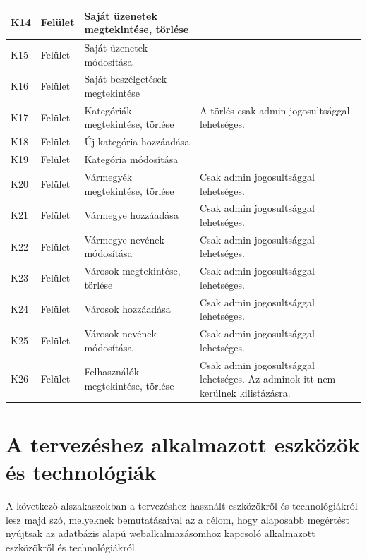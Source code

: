 \documentclass[]{thesis-ekf}
\theoremstyle{definition}
\theoremstyle{remark}
\begin{document}
\begin{longtable}{|l|l|p{3cm}|p{8cm}|}
			K14 & Felület & Saját üzenetek megtekintése, törlése & ~ \\ \hline
			K15 & Felület & Saját üzenetek módosítása & ~ \\ \hline
			K16 & Felület & Saját beszélgetések megtekintése & ~ \\ \hline
			K17 & Felület & Kategóriák megtekintése, törlése & A törlés csak admin jogosultsággal lehetséges. \\ \hline
			K18 & Felület & Új kategória hozzáadása & ~ \\ \hline
			K19 & Felület & Kategória módosítása & ~ \\ \hline
			K20 & Felület & Vármegyék megtekintése, törlése & Csak admin jogosultsággal lehetséges. \\ \hline
			K21 & Felület & Vármegye hozzáadása & Csak admin jogosultsággal lehetséges. \\ \hline
			K22 & Felület & Vármegye nevének módosítása & Csak admin jogosultsággal lehetséges. \\ \hline
			K23 & Felület & Városok megtekintése, törlése & Csak admin jogosultsággal lehetséges. \\ \hline
			K24 & Felület & Városok hozzáadása & Csak admin jogosultsággal lehetséges. \\ \hline
			K25 & Felület & Városok nevének módosítása & Csak admin jogosultsággal lehetséges. \\ \hline
			K26 & Felület & Felhasználók megtekintése, törlése & Csak admin jogosultsággal lehetséges. Az adminok itt nem kerülnek kilistázásra. \\ \hline
			
		\end{longtable}
		
	\section{A tervezéshez alkalmazott eszközök és technológiák}
		A következő alszakaszokban a tervezéshez használt eszközökről és technológiákról lesz majd szó, melyeknek bemutatásaival az a célom, hogy alaposabb megértést nyújtsak az adatbázis alapú webalkalmazásomhoz kapcsoló alkalmazott eszközökről és technológiákról.
\end{document}
